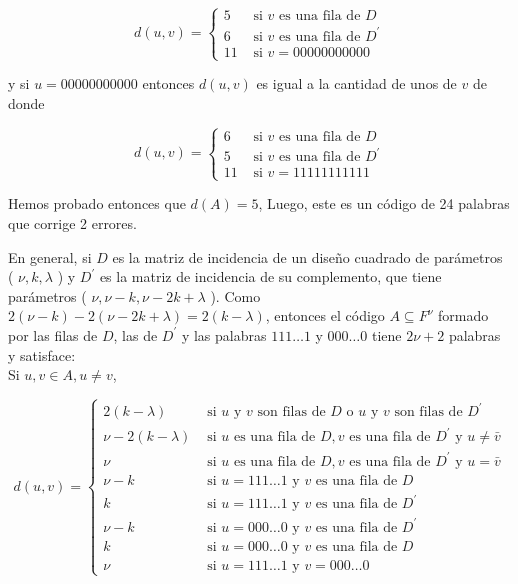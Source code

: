 \documentclass[10pt]{article}
\begin{document}
$$
d(u, v)= \begin{cases}5 & \text { si } v \text { es una fila de } D \\ 6 & \text { si } v \text { es una fila de } D^{\prime} \\ 11 & \text { si } v=00000000000\end{cases}
$$

y si $u=00000000000$ entonces $d(u, v)$ es igual a la cantidad de unos de $v$ de donde

$$
d(u, v)= \begin{cases}6 & \text { si } v \text { es una fila de } D \\ 5 & \text { si } v \text { es una fila de } D^{\prime} \\ 11 & \text { si } v=11111111111\end{cases}
$$

Hemos probado entonces que $d(A)=5$, Luego, este es un código de 24 palabras que corrige 2 errores.

En general, si $D$ es la matriz de incidencia de un diseño cuadrado de parámetros ( $\nu, k, \lambda$ ) y $D^{\prime}$ es la matriz de incidencia de su complemento, que tiene parámetros ( $\nu, \nu-k, \nu-2 k+\lambda$ ). Como $2(\nu-k)-2(\nu-2 k+\lambda)=2(k-\lambda)$, entonces el código $A \subseteq F^{\nu}$ formado por las filas de $D$, las de $D^{\prime}$ y las palabras $111 \ldots 1$ y $000 \ldots 0$ tiene $2 \nu+2$ palabras y satisface:\\
Si $u, v \in A, u \neq v$,

$$
d(u, v)= \begin{cases}2(k-\lambda) & \text { si } u \text { y } v \text { son filas de } D \text { o } u \text { y } v \text { son filas de } D^{\prime} \\ \nu-2(k-\lambda) & \text { si } u \text { es una fila de } D, v \text { es una fila de } D^{\prime} \text { y } u \neq \bar{v} \\ \nu & \text { si } u \text { es una fila de } D, v \text { es una fila de } D^{\prime} \text { y } u=\bar{v} \\ \nu-k & \text { si } u=111 \ldots 1 \text { y } v \text { es una fila de } D \\ k & \text { si } u=111 \ldots 1 \text { y } v \text { es una fila de } D^{\prime} \\ \nu-k & \text { si } u=000 \ldots 0 \text { y } v \text { es una fila de } D^{\prime} \\ k & \text { si } u=000 \ldots 0 \text { y } v \text { es una fila de } D \\ \nu & \text { si } u=111 \ldots 1 \text { y } v=000 \ldots 0\end{cases}
$$
\end{document}
